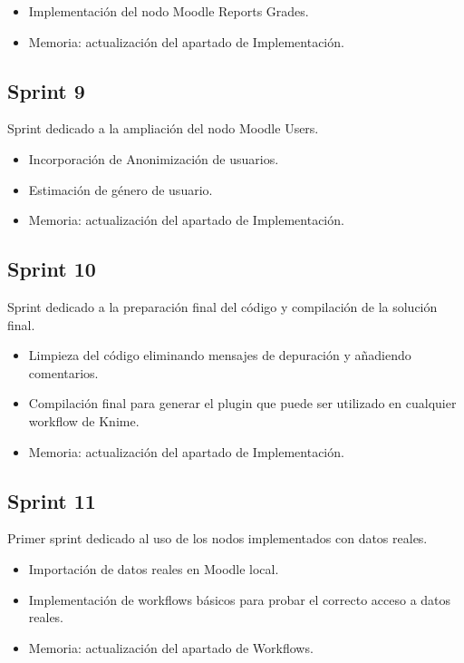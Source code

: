 \begin{itemize}
	\item Implementación del nodo Moodle Reports Grades. 
	\item Memoria: actualización del apartado de Implementación. 
\end{itemize}


\subsection{Sprint 9}

Sprint dedicado a la ampliación del nodo Moodle Users. 

\begin{itemize}
	\item Incorporación de Anonimización de usuarios.
	\item Estimación de género de usuario. 
	\item Memoria: actualización del apartado de Implementación. 
\end{itemize}



\subsection{Sprint 10}

Sprint dedicado a la preparación final del código y compilación de la solución final. 

\begin{itemize}
	\item Limpieza del código eliminando mensajes de depuración y añadiendo comentarios.
	\item Compilación final para generar el plugin que puede ser utilizado en cualquier workflow de Knime. 
	\item Memoria: actualización del apartado de Implementación. 
\end{itemize}



\subsection{Sprint 11}

Primer sprint dedicado al uso de los nodos implementados con datos reales. 

\begin{itemize}
	\item Importación de datos reales en Moodle local. 
	\item Implementación de workflows básicos para probar el correcto acceso a datos reales. 
	\item Memoria: actualización del apartado de Workflows. 
\end{itemize}





